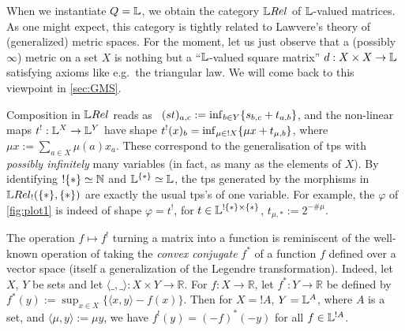 
When we instantiate $Q=\mathbb{L}$, we obtain the category $\LREL$ of $\mathbb{L}$-valued matrices. As one might expect, this category is tightly related to Lawvere's theory of (generalized) metric spaces. For the moment, let us just observe that a (possibly $\infty$) metric on a set $X$ is nothing but a ``$\mathbb{L}$-valued square matrix'' $d:X\times X\to \mathbb{L}$ satisfying axioms like e.g.~the triangular law.
We will come back to this viewpoint in \autoref{sec:GMS}.

Composition in $\LREL$ %
reads as \ $(st)_{a,c}:=\inf_{b\in Y}\{s_{b,c}+t_{a,b}\}$, and the non-linear maps $t^{!}: \mathbb{L}^{X}\to \mathbb{L}^{Y}$ have shape 
$t^!(x)_b=\inf_{\mu\in !X} \{\mu x+ t_{\mu,b}\}$, where $\mu x:=\sum_{a\in X} \mu(a)x_a$. These correspond to the generalisation of tps with \emph{possibly infinitely} many variables (in fact, as many as the elements of $X$).
By identifying $!\{*\}\simeq \mathbb{N}$ and $\mathbb{L}^{\{*\}}\simeq\mathbb{L}$, the tps generated by the morphisms in $\HOM{\LREL_!}{\set{*}}{\set{*}}$ are exactly the %
usual tps's of one variable. %
For example, the $\varphi$ of \autoref{fig:plot1} is indeed of shape $\varphi=t^!$, for $t\in\mathbb{L}^{!\{*\}\times\{*\}}$, $t_{\mu,*}:=2^{-\# \mu}$.

\begin{remark}
The operation $f\mapsto f^{!}$ turning a matrix into a function is reminiscent of the well-known operation of taking the 
 \emph{convex conjugate} $f^*$ of a function $f$ defined over a vector space (itself a generalization of the Legendre transformation).
 Indeed, let $X$, $Y$ be sets and let $\langle \_,\_\rangle:X\times Y \to \mathbb{R}$.
 For $f:X\to \mathbb R$, let $f^*:Y\to \mathbb R$ be defined by $f^*(y):= \sup_{x\in X}\{\langle x,y\rangle - f(x)\}$.
 Then for $X=!A$, $Y=\mathbb{L}^A$, where $A$ is a set, and $\langle \mu, y \rangle:= \mu y$, we have $f^!(y)=(-f)^*(-y)$ for all $f\in\mathbb{L}^{!A}$.
\end{remark}


